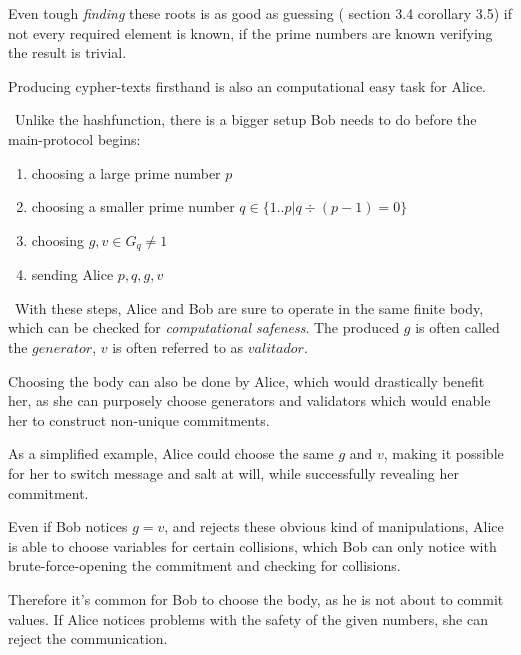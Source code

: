 Even tough \textit{finding} these roots is as good as guessing (\cite{b1} section 3.4 corollary 3.5) if not every required element is known, if the prime numbers are known verifying the result is trivial. 

Producing cypher-texts firsthand is also an computational easy task for Alice. 

~\newline Unlike the hashfunction, there is a bigger setup Bob needs to do before the main-protocol begins: 
	\begin{enumerate}
		\item choosing a large prime number $p$
		\item choosing a smaller prime number \newline $q \in \{1..p| q\div (p-1) = 0\}$
		\item choosing $g,v \in G_q \neq 1$
		\item sending Alice $p,q,g,v$ 
	\end{enumerate}
~\newline With these steps, Alice and Bob are sure to operate in the same finite body, which can be checked for \textit{computational safeness}. The produced $g$ is often called the $generator$, $v$ is often referred to as $valitador$.

Choosing the body can also be done by Alice, which would drastically benefit her, as she can purposely choose generators and validators which would enable her to construct non-unique commitments. 

As a simplified example, Alice could choose the same $g$ and $v$, making it possible for her to switch message and salt at will, while successfully revealing her commitment. 

Even if Bob notices $g=v$, and rejects these obvious kind of manipulations, Alice is able to choose variables for certain collisions, which Bob can only notice with brute-force-opening the commitment and checking for collisions. 

Therefore it's common for Bob to choose the body, as he is not about to commit values. If Alice notices problems with the safety of the given numbers, she can reject the communication.  

